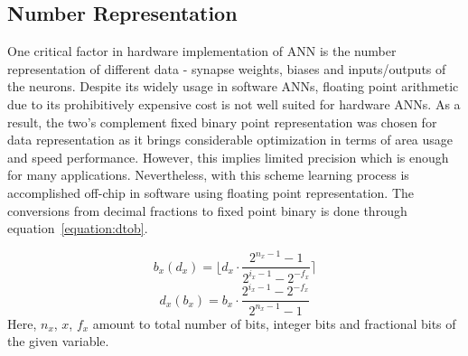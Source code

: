 \subsection{Number Representation}

One critical factor in hardware implementation of ANN is the number representation of different data - synapse weights, biases and inputs/outputs of the neurons. Despite its widely usage in software ANNs, floating point arithmetic due to its prohibitively expensive cost is not well suited for hardware ANNs. As a result, the two's complement fixed binary point representation was chosen for data representation as it brings considerable optimization in terms of area usage and speed performance. However, this implies limited precision which is enough for many applications. Nevertheless, with this scheme learning process is accomplished off-chip in software using floating point representation. The conversions from decimal fractions to fixed point binary is done through equation~\ref{equation:dtob}.

\begin{equation}
b_{x}(d_{x})= \lfloor{d_{x}\cdot \frac{2^{n_{x}-1}-1}{2^{i_{x}-1}-2^{-f_{x}}}}\rceil
\label{equation:dtob}
\end{equation}
\begin{equation}
d_{x}(b_{x})= {b_{x}\cdot \frac{2^{i_{x}-1}-2^{-f_{x}}}{2^{n_{x}-1}-1}}
\label{equation:btod}
\end{equation}
Here, $n_{x}$, ${x}$, $f_{x}$ amount to total number of bits, integer bits and fractional bits of the given variable.